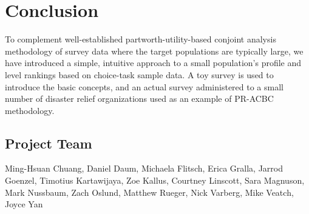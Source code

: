 \documentclass[a4paper, 12pt]{article}
\begin{document}
\section{Conclusion}
To complement well-established partworth-utility-based conjoint analysis methodology of survey data where the target populations are typically large, we have introduced a simple, intuitive approach to a small population's profile and level rankings based on choice-task sample data. A toy survey is used to introduce the basic concepts, and an actual survey administered to a small number of disaster relief organizations used as an example of PR-ACBC methodology. 






\subsection*{Project Team}

Ming-Hsuan Chuang,
Daniel Daum, Michaela Flitsch, Erica Gralla, Jarrod Goenzel, Timotius Kartawijaya, Zoe Kallus, Courtney Linscott, Sara Magnuson, Mark Nussbaum, Zach Oslund, Matthew Rueger, Nick Varberg, Mike Veatch, Joyce Yan   
\end{document}
